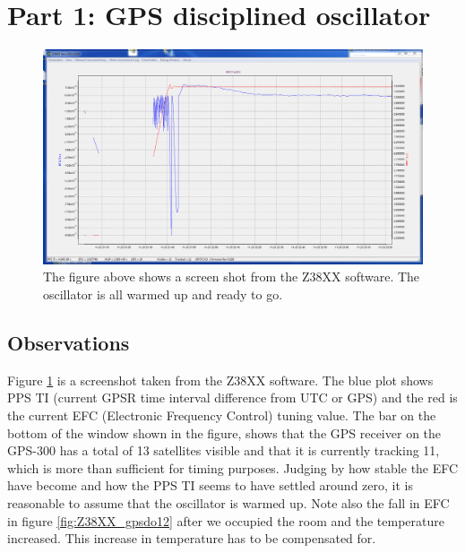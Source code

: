\documentclass[11pt,english,a4paper]{article}
\begin{document}
\section{Part 1: GPS disciplined oscillator}
\begin{figure}[!htb]
  \centering
  \includegraphics[width=1\textwidth]{z38xx_EFC_oppstart.PNG}
  \caption[Z38XX screen shot] {The figure above shows a screen shot from the Z38XX software. The oscillator is all warmed up and ready to go.} 
  \label{fig:z38xx_oppstart}
\end{figure}

\subsection{Observations}
Figure \ref{fig:z38xx_oppstart} is a screenshot taken from the Z38XX software. The blue plot shows PPS TI (current GPSR time interval difference from UTC or GPS) and the red is the current EFC (Electronic Frequency Control) tuning value. The bar on the bottom of the window shown in the figure, shows that the GPS receiver on the GPS-300 has a total of 13 satellites visible and that it is currently tracking 11, which is more than sufficient for timing purposes. Judging by how stable the EFC have become and how the PPS TI seems to have settled around zero, it is reasonable to assume that the oscillator is warmed up. Note also the fall in EFC in figure \ref{fig:Z38XX_gpsdo12} after we occupied the room and the temperature increased. This increase in temperature has to be compensated for.
\end{document}
